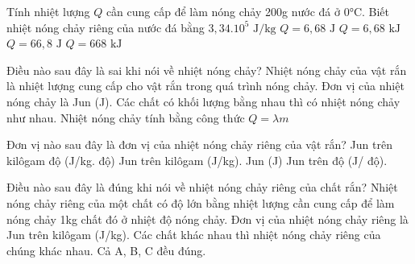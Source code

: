 \begin{ex}
Tính nhiệt lượng $Q$ cần cung cấp để làm nóng chảy 200g nước đá ở 0°C. Biết nhiệt nóng chảy riêng của nước đá bằng $3,34.10^5 \text{ J/kg}$
\choice
{$Q = 6,68 \text{ J}$}
{\True $Q = 6,68 \text{ kJ}$}
{$Q = 66,8 \text{ J}$}
{$Q = 668 \text{ kJ}$}
\end{ex}

\begin{ex}
Điều nào sau đây là sai khi nói về nhiệt nóng chảy?
\choice
{Nhiệt nóng chảy của vật rắn là nhiệt lượng cung cấp cho vật rắn trong quá trình nóng chảy.}
{Đơn vị của nhiệt nóng chảy là Jun (J).}
{\True Các chất có khối lượng bằng nhau thì có nhiệt nóng chảy như nhau.}
{Nhiệt nóng chảy tính bằng công thức $Q = \lambda m$}
\end{ex}

\begin{ex}
Đơn vị nào sau đây là đơn vị của nhiệt nóng chảy riêng của vật rắn?
\choice
{Jun trên kilôgam độ (J/kg. độ)}
{\True Jun trên kilôgam (J/kg).}
{Jun (J)}
{Jun trên độ (J/ độ).}
\end{ex}

\begin{ex}
Điều nào sau đây là đúng khi nói về nhiệt nóng chảy riêng của chất rắn?
\choice
{Nhiệt nóng chảy riêng của một chất có độ lớn bằng nhiệt lượng cần cung cấp để làm nóng chảy 1kg chất đó ở nhiệt độ nóng chảy.}
{Đơn vị của nhiệt nóng chảy riêng là Jun trên kilôgam (J/kg).}
{Các chất khác nhau thì nhiệt nóng chảy riêng của chúng khác nhau.}
{\True Cả A, B, C đều đúng.}
\end{ex}

